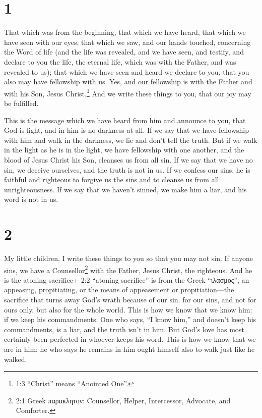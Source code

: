 \hypertarget{section}{%
\section{1}\label{section}}

 That which was from the beginning, that which we have
heard, that which we have seen with our eyes, that which we saw, and our
hands touched, concerning the Word of life  (and the life
was revealed, and we have seen, and testify, and declare to you the
life, the eternal life, which was with the Father, and was revealed to
us);  that which we have seen and heard we declare to you,
that you also may have fellowship with us. Yes, and our fellowship is
with the Father and with his Son, Jesus Christ.\footnote{1:3 ``Christ''
  means ``Anointed One''.}  And we write these things to
you, that our joy may be fulfilled.

 This is the message which we have heard from him and
announce to you, that God is light, and in him is no darkness at all.
 If we say that we have fellowship with him and walk in the
darkness, we lie and don't tell the truth.  But if we walk
in the light as he is in the light, we have fellowship with one another,
and the blood of Jesus Christ his Son, cleanses us from all sin.
 If we say that we have no sin, we deceive ourselves, and
the truth is not in us.  If we confess our sins, he is
faithful and righteous to forgive us the sins and to cleanse us from all
unrighteousness.  If we say that we haven't sinned, we make
him a liar, and his word is not in us.

\hypertarget{section-1}{%
\section{2}\label{section-1}}

 My little children, I write these things to you so that you
may not sin. If anyone sins, we have a Counsellor\footnote{2:1 Greek
  παρακλητον: Counsellor, Helper, Intercessor, Advocate, and Comforter.}
with the Father, Jesus Christ, the righteous.  And he is the
atoning sacrifice+ 2:2 ``atoning sacrifice'' is from the Greek
``ιλασμος'', an appeasing, propitiating, or the means of appeasement or
propitiation---the sacrifice that turns away God's wrath because of our
sin. for our sins, and not for ours only, but also for the whole world.
 This is how we know that we know him: if we keep his
commandments.  One who says, ``I know him,'' and doesn't
keep his commandments, is a liar, and the truth isn't in him.
 But God's love has most certainly been perfected in whoever
keeps his word. This is how we know that we are in him:  he
who says he remains in him ought himself also to walk just like he
walked.

